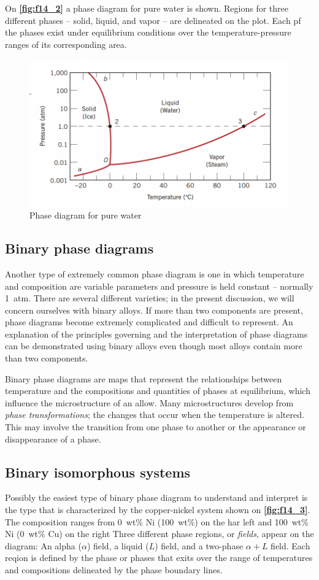 On \textbf{\autoref{fig:f14_2}} a phase diagram for pure water is shown. Regions for three different phases -- solid, liquid, and vapor -- are delineated on the plot. Each pf the phases exist under equilibrium conditions over the temperature-pressure ranges of its corresponding area. 

\begin{figure} [ht]
  \centering
  \includegraphics[width=0.5\linewidth]{./figures/f14_2.png}
  \caption{Phase diagram for pure water}
  \label{fig:f14_2}
\end{figure}


\subsection{Binary phase diagrams}
Another type of extremely common phase diagram is one in which temperature and composition are variable parameters and pressure is held constant -- normally \qty{1}{atm}. There are several different varieties; in the present discussion, we will concern ourselves with binary alloys. If more than two components are present, phase diagrams become extremely complicated and difficult to represent. An explanation of the principles governing and the interpretation of phase diagrams can be demonstrated using binary alloys even though most alloys contain more than two components.

Binary phase diagrams are maps that represent the relationships between temperature and the compositions and quantities of phases at equilibrium, which influence the microstructure of an allow. Many microstructures develop from \textit{phase transformations}; the changes that occur when the temperature is altered. This may involve the transition from one phase to another or the appearance or disappearance of a phase. 


\subsection{Binary isomorphous systems}
Possibly the easiest type of binary phase diagram to understand and interpret is the type that is characterized by the copper-nickel system shown on \textbf{\autoref{fig:f14_3}}. The composition ranges from \qty{0}{wt}\% Ni (\qty{100}{wt}\%) on the har left and \qty{100}{wt}\% Ni (\qty{0}{wt}\% Cu) on the right Three different phase regions, or \textit{fields}, appear on the diagram: An alpha ($\alpha$) field, a liquid ($L$) field, and a two-phase $\alpha+L$ field. Each reqion is defined by the phase or phases that exits over the range of temperatures and compositions delineated by the phase boundary lines.

